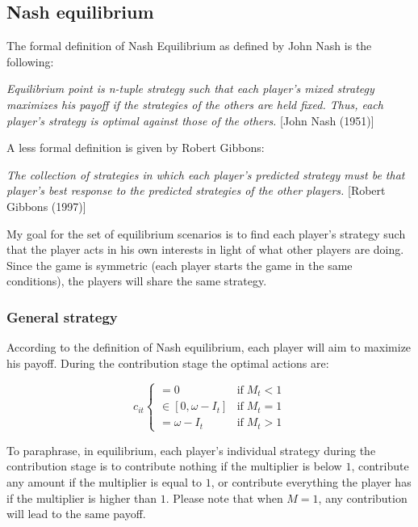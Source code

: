	\subsection{Nash equilibrium}

		The formal definition of Nash Equilibrium as defined by John Nash is the following:
		
		\begin{displayquote}
			\textit{
				Equilibrium point is n-tuple strategy such that each player's mixed strategy maximizes his payoff if the strategies of the others are held fixed. Thus, each player's strategy is optimal against those of the others.
			}
			[John Nash (1951)]
		\end{displayquote}
		
		A less formal definition is given by Robert Gibbons:

		\begin{displayquote}
			\textit{
				The collection of strategies in which each player's predicted strategy must be that player's best response to the predicted strategies of the other players.
			}
			[Robert Gibbons (1997)]
		\end{displayquote}

		My goal for the set of equilibrium scenarios is to find each player's strategy such that the player acts in his own interests in light of what other players are doing. Since the game is symmetric (each player starts the game in the same conditions), the players will share the same strategy.

		\subsubsection{General strategy}

			According to the definition of Nash equilibrium, each player will aim to maximize his payoff. During the contribution stage the optimal actions are:

			\[
				c_{it}  
					\begin{cases}
						= 0 					& \text{if} \; M_t < 1 \\
						\in [0, \omega - I_t]	& \text{if} \; M_t = 1 \\
						= \omega - I_t			& \text{if} \; M_t > 1
					\end{cases}
			\]

			To paraphrase, in equilibrium, each player's individual strategy during the contribution stage is to contribute nothing if the multiplier is below $1$, contribute any amount if the multiplier is equal to $1$, or contribute everything the player has if the multiplier is higher than $1$. Please note that when $M = 1$, any contribution will lead to the same payoff.

